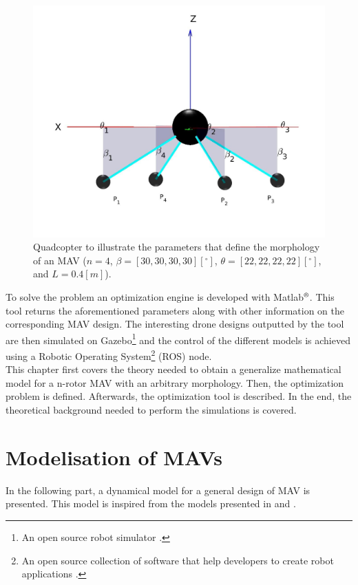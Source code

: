 \begin{figure}[h]
\begin{minipage}[t]{0.3\textwidth}
  \centering
  \includegraphics[width=\textwidth]{images/drone_design2.jpg}
\end{minipage}
\caption{Quadcopter to illustrate the parameters that define the morphology of an
MAV ($n = 4$, $\beta = [30, 30, 30, 30] [^{\circ}]$, $\theta = [22, 22, 22, 22]
[^{\circ}]$, and $L = 0.4 [m]$).}
\label{fig:drone_design}
\end{figure}

To solve the problem an optimization engine is developed with
Matlab$^\textrm{\textregistered}$. This tool returns the aforementioned
parameters along with other information on the corresponding MAV design.
The interesting drone designs outputted by the tool are then simulated on
Gazebo\footnote{An open source robot simulator \citep{noauthor_gazebo_nodate}.}
and the control of the different models is achieved using a Robotic Operating
System\footnote{An open source collection of software that help developers to
create robot applications \citep{rostutorials}.} (ROS) node.\\
This chapter first covers the theory needed to obtain a generalize mathematical
model for a n-rotor MAV with an arbitrary morphology. Then, the optimization
problem is defined. Afterwards, the optimization tool is described. In the end,
the theoretical background needed to perform the simulations is covered.

\section{Modelisation of MAVs}
\label{sec:modeling_mav}
In the following part, a dynamical model for a general design of MAV is presented.
This model is inspired from the models presented in \citep{kamel_voliro:_2018} and
\citep{ryll_modeling_2012}.

